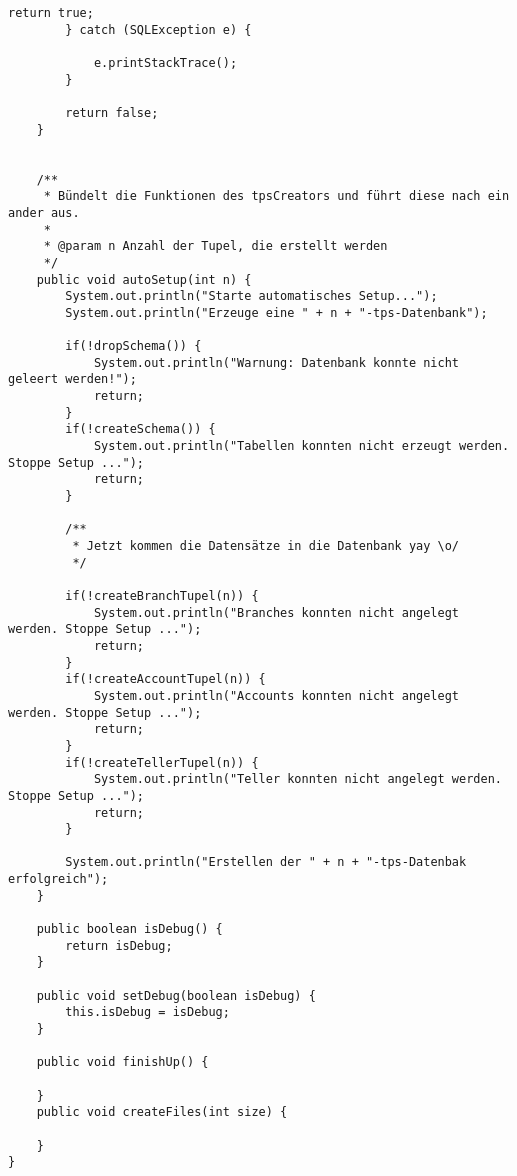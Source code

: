 \begin{lstlisting}[caption={TpsCreatorOldStatements (optimiert)}, label={lst:tpsoldv2}]
			return true;
		} catch (SQLException e) {

			e.printStackTrace();
		}
		
		return false;
	}
	
	
	/**
	 * Bündelt die Funktionen des tpsCreators und führt diese nach ein ander aus.
	 * 
	 * @param n Anzahl der Tupel, die erstellt werden
	 */
	public void autoSetup(int n) {
		System.out.println("Starte automatisches Setup...");
		System.out.println("Erzeuge eine " + n + "-tps-Datenbank");
		
		if(!dropSchema()) {
			System.out.println("Warnung: Datenbank konnte nicht geleert werden!");
			return;
		}
		if(!createSchema()) {
			System.out.println("Tabellen konnten nicht erzeugt werden. Stoppe Setup ...");
			return;
		}
		
		/**
		 * Jetzt kommen die Datensätze in die Datenbank yay \o/
		 */
		
		if(!createBranchTupel(n)) {
			System.out.println("Branches konnten nicht angelegt werden. Stoppe Setup ...");
			return;
		}
		if(!createAccountTupel(n)) {
			System.out.println("Accounts konnten nicht angelegt werden. Stoppe Setup ...");
			return;
		}
		if(!createTellerTupel(n)) {
			System.out.println("Teller konnten nicht angelegt werden. Stoppe Setup ...");
			return;
		}
		
		System.out.println("Erstellen der " + n + "-tps-Datenbak erfolgreich");
	}

	public boolean isDebug() {
		return isDebug;
	}

	public void setDebug(boolean isDebug) {
		this.isDebug = isDebug;
	}

	public void finishUp() {
		
	}
	public void createFiles(int size) {
		
	}
}
\end{lstlisting}